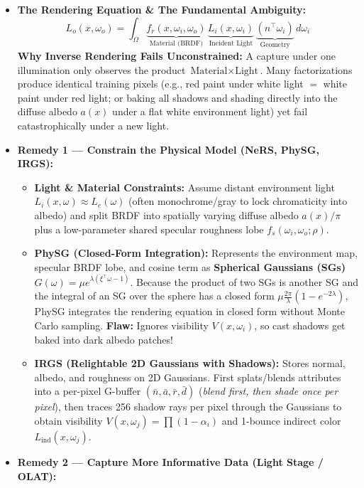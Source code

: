 \documentclass[10pt, a4paper]{article}
\begin{document}
\begin{itemize}
    \item \textbf{The Rendering Equation \& The Fundamental Ambiguity:}
    $$L_o(x, \omega_o) = \int_\Omega \underbrace{f_r(x, \omega_i, \omega_o)}_{\text{Material (BRDF)}} \, \underbrace{L_i(x, \omega_i)}_{\text{Incident Light}} \, \underbrace{(n^\top \omega_i)}_{\text{Geometry}} \, d\omega_i$$
    \textbf{Why Inverse Rendering Fails Unconstrained:} A capture under one illumination only observes the product $\text{Material} \times \text{Light}$. Many factorizations produce identical training pixels (e.g., red paint under white light $=$ white paint under red light; or baking all shadows and shading directly into the diffuse albedo $a(x)$ under a flat white environment light) yet fail catastrophically under a new light.
    \item \textbf{Remedy 1 --- Constrain the Physical Model (NeRS, PhySG, IRGS):}
    \begin{itemize}
        \item \textbf{Light \& Material Constraints:} Assume distant environment light $L_i(x,\omega) \approx L_e(\omega)$ (often monochrome/gray to lock chromaticity into albedo) and split BRDF into spatially varying diffuse albedo $a(x)/\pi$ plus a low-parameter shared specular roughness lobe $f_s(\omega_i, \omega_o; \rho)$.
        \item \textbf{PhySG (Closed-Form Integration):} Represents the environment map, specular BRDF lobe, and cosine term as \textbf{Spherical Gaussians (SGs)} $G(\omega) = \mu e^{\lambda(\xi^\top \omega - 1)}$. Because the product of two SGs is another SG and the integral of an SG over the sphere has a closed form $\mu\frac{2\pi}{\lambda}(1-e^{-2\lambda})$, PhySG integrates the rendering equation in closed form without Monte Carlo sampling. \textbf{Flaw:} Ignores visibility $V(x,\omega_i)$, so cast shadows get baked into dark albedo patches!
        \item \textbf{IRGS (Relightable 2D Gaussians with Shadows):} Stores normal, albedo, and roughness on 2D Gaussians. First splats/blends attributes into a per-pixel G-buffer $(\bar{n}, \bar{a}, \bar{r}, \bar{d})$ (\emph{blend first, then shade once per pixel}), then traces 256 shadow rays per pixel through the Gaussians to obtain visibility $V(x,\omega_j) = \prod(1-\alpha_i)$ and 1-bounce indirect color $L_{\text{ind}}(x,\omega_j)$.
    \end{itemize}
    \item \textbf{Remedy 2 --- Capture More Informative Data (Light Stage / OLAT):}

\end{itemize}
\end{document}
